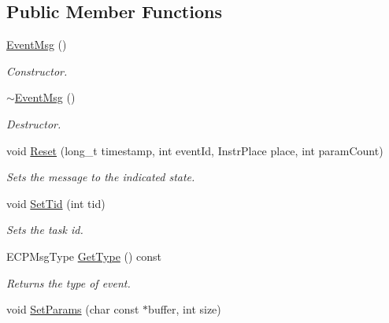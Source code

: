 \subsection*{Public Member Functions}
\begin{DoxyCompactItemize}
\item 
\hypertarget{class_common_1_1_event_msg_a80cbc0730f7b70ae74babd298a91ec98}{\hyperlink{class_common_1_1_event_msg_a80cbc0730f7b70ae74babd298a91ec98}{Event\-Msg} ()}\label{class_common_1_1_event_msg_a80cbc0730f7b70ae74babd298a91ec98}

\begin{DoxyCompactList}\small\item\em Constructor. \end{DoxyCompactList}\item 
\hypertarget{class_common_1_1_event_msg_a74eb56c9e54447a26b7a646ba909531d}{\hyperlink{class_common_1_1_event_msg_a74eb56c9e54447a26b7a646ba909531d}{$\sim$\-Event\-Msg} ()}\label{class_common_1_1_event_msg_a74eb56c9e54447a26b7a646ba909531d}

\begin{DoxyCompactList}\small\item\em Destructor. \end{DoxyCompactList}\item 
void \hyperlink{class_common_1_1_event_msg_a3dfd468f489cfb9b3ca47a6ff7c31b66}{Reset} (long\-\_\-t timestamp, int event\-Id, Instr\-Place place, int param\-Count)
\begin{DoxyCompactList}\small\item\em Sets the message to the indicated state. \end{DoxyCompactList}\item 
\hypertarget{class_common_1_1_event_msg_a3214ec6fb7cb75e537484e16f626122f}{void \hyperlink{class_common_1_1_event_msg_a3214ec6fb7cb75e537484e16f626122f}{Set\-Tid} (int tid)}\label{class_common_1_1_event_msg_a3214ec6fb7cb75e537484e16f626122f}

\begin{DoxyCompactList}\small\item\em Sets the task id. \end{DoxyCompactList}\item 
\hypertarget{class_common_1_1_event_msg_a653dc46368270cfdc04f08330fabb8b0}{E\-C\-P\-Msg\-Type \hyperlink{class_common_1_1_event_msg_a653dc46368270cfdc04f08330fabb8b0}{Get\-Type} () const }\label{class_common_1_1_event_msg_a653dc46368270cfdc04f08330fabb8b0}

\begin{DoxyCompactList}\small\item\em Returns the type of event. \end{DoxyCompactList}\item 
\hypertarget{class_common_1_1_event_msg_a1f7e1bd0f49f01f90dde8aebfe34ead1}{void \hyperlink{class_common_1_1_event_msg_a1f7e1bd0f49f01f90dde8aebfe34ead1}{Set\-Params} (char const $\ast$buffer, int size)}\label{class_common_1_1_event_msg_a1f7e1bd0f49f01f90dde8aebfe34ead1}


\end{DoxyCompactItemize}
